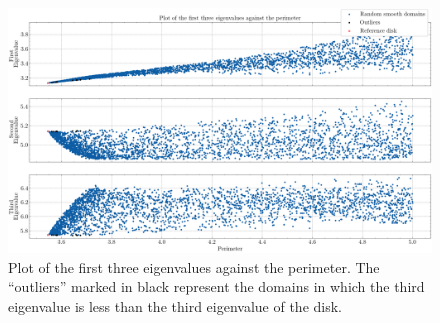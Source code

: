 \begin{figure}[!htb]
    \centering
    \begin{minipage}[c]{0.8\textwidth}
        \centering
        \includegraphics[width=\textwidth]{Images/Dirac/smooth/smooth_domains_scatter_all_eigs_.png}
        \caption{Plot of the first three eigenvalues against the perimeter. The ``outliers'' marked in black represent the domains in which the third eigenvalue is less than the third eigenvalue of the disk.}
        \label{dirac_smooth_domains_scatter_all_eigs}
    \end{minipage}

    \vspace{0.5cm}


\end{figure}
